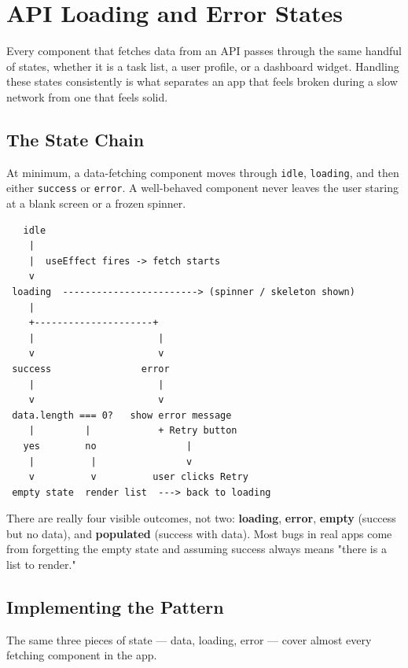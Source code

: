 \chapter{API Loading and Error States}

Every component that fetches data from an API passes through the same
handful of states, whether it is a task list, a user profile, or a
dashboard widget. Handling these states consistently is what separates an
app that feels broken during a slow network from one that feels solid.

\section{The State Chain}

At minimum, a data-fetching component moves through \texttt{idle},
\texttt{loading}, and then either \texttt{success} or \texttt{error}. A
well-behaved component never leaves the user staring at a blank screen or a
frozen spinner.

\begin{diagrambox}
\begin{verbatim}
   idle
    |
    |  useEffect fires -> fetch starts
    v
 loading  ------------------------> (spinner / skeleton shown)
    |
    +---------------------+
    |                      |
    v                      v
 success                error
    |                      |
    v                      v
 data.length === 0?   show error message
    |         |            + Retry button
   yes        no                |
    |          |                v
    v          v          user clicks Retry
 empty state  render list  ---> back to loading
\end{verbatim}
\end{diagrambox}

\begin{notebox}[NOTE]
There are really four visible outcomes, not two: \textbf{loading},
\textbf{error}, \textbf{empty} (success but no data), and \textbf{populated}
(success with data). Most bugs in real apps come from forgetting the empty
state and assuming success always means "there is a list to render."
\end{notebox}

\section{Implementing the Pattern}

The same three pieces of state --- data, loading, error --- cover almost
every fetching component in the app.

